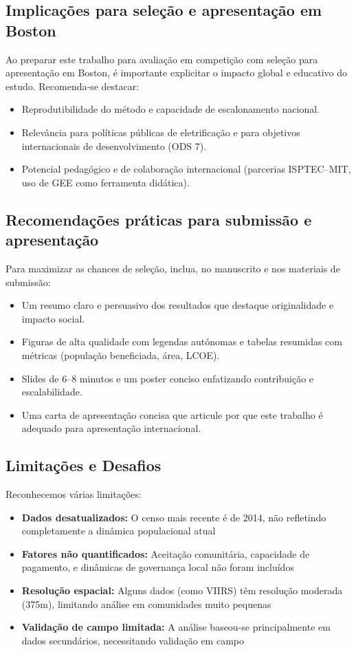 \documentclass[12pt, a4paper]{article}
\begin{document}
\subsection{Implicações para seleção e apresentação em Boston}
Ao preparar este trabalho para avaliação em competição com seleção para apresentação em Boston, é importante explicitar o impacto global e educativo do estudo. Recomenda‑se destacar:
\begin{itemize}
    \item Reprodutibilidade do método e capacidade de escalonamento nacional.
    \item Relevância para políticas públicas de eletrificação e para objetivos internacionais de desenvolvimento (ODS 7).
    \item Potencial pedagógico e de colaboração internacional (parcerias ISPTEC–MIT, uso de GEE como ferramenta didática).
\end{itemize}

\subsection{Recomendações práticas para submissão e apresentação}
Para maximizar as chances de seleção, inclua, no manuscrito e nos materiais de submissão:
\begin{itemize}
    \item Um resumo claro e persuasivo dos resultados que destaque originalidade e impacto social.
    \item Figuras de alta qualidade com legendas autónomas e tabelas resumidas com métricas (população beneficiada, área, LCOE).
    \item Slides de 6–8 minutos e um poster conciso enfatizando contribuição e escalabilidade.
    \item Uma carta de apresentação concisa que articule por que este trabalho é adequado para apresentação internacional.
\end{itemize}

\subsection{Limitações e Desafios}

Reconhecemos várias limitações:
\begin{itemize}
    \item \textbf{Dados desatualizados:} O censo mais recente é de 2014, não refletindo completamente a dinâmica populacional atual
    \item \textbf{Fatores não quantificados:} Aceitação comunitária, capacidade de pagamento, e dinâmicas de governança local não foram incluídos
    \item \textbf{Resolução espacial:} Alguns dados (como VIIRS) têm resolução moderada (375m), limitando análise em comunidades muito pequenas
    \item \textbf{Validação de campo limitada:} A análise baseou-se principalmente em dados secundários, necessitando validação em campo
\end{itemize}
\end{document}
